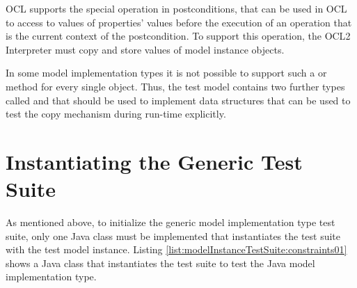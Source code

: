 \acs{OCL} supports the special operation  in postconditions, that can be used in \acs{OCL} to access to values of properties' values before the execution of an operation that is the current context of the postcondition. To support this operation, the \acs{OCL}2 Interpreter must copy and store values of model instance objects. 

In some model implementation types it is not possible to support such a  or  method for every single object. Thus, the test model contains two further types called  and  that should be used to implement data structures that can be used to test the copy mechanism during run-time explicitly.



\section{Instantiating the Generic Test Suite}
\label{modelInstanceTestSuite:setupTestSuite}

As mentioned above, to initialize the generic model implementation type test suite, only one Java class must be implemented that instantiates the test suite with the test model instance. Listing \ref{list:modelInstanceTestSuite:constraints01} shows a Java class that instantiates the test suite to test the Java model implementation type.

